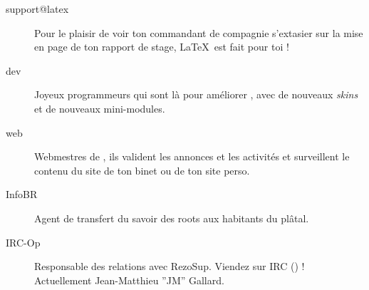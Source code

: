 \begin{description}
  \item[support@latex] {Pour le plaisir de voir ton commandant de compagnie s'extasier sur la mise en page de ton rapport de stage, \LaTeX~est fait pour toi !}

  \item[dev]{Joyeux programmeurs qui sont l\`a pour am\'eliorer \fkz, avec de nouveaux \emph{skins} et de nouveaux mini-modules.}


  \item[web] {Webmestres de \fkz, ils valident les annonces et les activit\'es et surveillent le contenu du site de ton binet ou de ton site perso.}


  \item[InfoBR]{Agent de transfert du savoir des roots aux habitants du pl\^atal.}



  \item[IRC-Op]{Responsable des relations avec RezoSup. Viendez sur IRC () ! \linebreak Actuellement Jean-Matthieu ''JM'' Gallard.}




\end{description}

